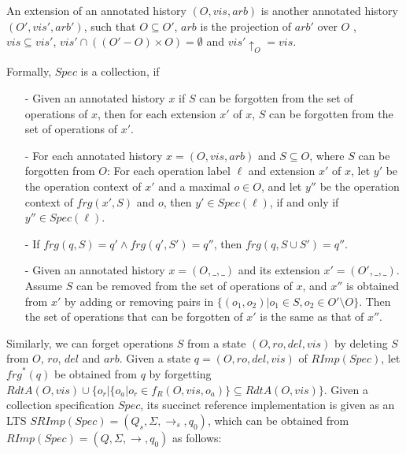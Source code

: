 An extension of an annotated history $(O,\mathit{vis},\mathit{arb})$ is another annotated history $(O',\mathit{vis}',\mathit{arb}')$, such that $O \subseteq O'$, $\mathit{arb}$ is the projection of $\mathit{arb}'$ over $O$ , $\mathit{vis} \subseteq \mathit{vis}'$, $\mathit{vis}' \cap ( (O'-O) \times O ) = \emptyset$ and $\mathit{vis}' \uparrow_{O} = \mathit{vis}$. {\color {red}Formally, $\mathit{Spec}$ is a collection, if

\begin{itemize}
\setlength{\itemsep}{0.5pt}
\item[-] Given an annotated history $x$ if $S$ can be forgotten from the set of operations of $x$, then for each extension $x'$ of $x$, $S$ can be forgotten from the set of operations of $x'$.

\item[-] For each annotated history $x = (O,\mathit{vis},\mathit{arb})$ and $S \subseteq O$, where $S$ can be forgotten from $O$: For each operation label $\ell$ and extension $x'$ of $x$, let $y'$ be the operation context of $x'$ and a maximal $o \in O$, and let $y''$ be the operation context of $frg(x',S)$ and $o$, then $y' \in Spec(\ell)$, if and only if $y'' \in Spec(\ell)$.

\item[-] If $\mathit{frg}(q,S) = q' \wedge \mathit{frg}(q',S') = q''$, then $\mathit{frg}(q,S \cup S') =q''$.

\item[-] Given an annotated history $x = (O,\_,\_)$ and its extension $x' = (O',\_,\_)$. Assume $S$ can be removed from the set of operations of $x$, and $x''$ is obtained from $x'$ by adding or removing pairs in $\{ (o_1,o_2) \vert o_1 \in S, o_2 \in O' \setminus O \}$. Then the set of operations that can be forgotten of $x'$ is the same as that of $x''$.
\end{itemize}
}

Similarly, we can forget operations $S$ from a state $(O,\mathit{ro},\mathit{del},\mathit{vis})$ by deleting $S$ from $O$, $\mathit{ro}$, $\mathit{del}$ and $\mathit{arb}$. {\color {red}Given a state $q = (O,\mathit{ro},\mathit{del},\mathit{vis})$ of $\mathit{RImp}(\mathit{Spec})$, let $\mathit{frg}^*(q)$ be obtained from $q$ by forgetting} $\mathit{RdtA}(O,\mathit{vis}) \cup \{ o_r \vert  \{ o_a \vert o_r \in f_R(O,\mathit{vis},o_a) \} \subseteq \mathit{RdtA}(O,\mathit{vis}) \}$. Given a collection specification $\mathit{Spec}$, its succinct reference implementation is given as an LTS $\mathit{SRImp}(\mathit{Spec}) = (Q_s,\Sigma,\rightarrow_s,q_0)$, which can be obtained from $\mathit{RImp}(\mathit{Spec}) = (Q,\Sigma,\rightarrow,q_0)$ as follows:

